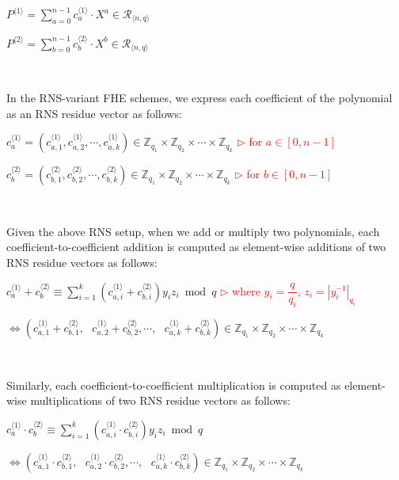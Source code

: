 $P^{\langle 1 \rangle} = \sum\limits_{a=0}^{n-1} c^{\langle 1 \rangle}_a \cdot X^a \in \mathcal{R}_{\langle n, q\rangle}$

$P^{\langle 2 \rangle} = \sum\limits_{b=0}^{n-1} c^{\langle 2 \rangle}_b \cdot X^b \in \mathcal{R}_{\langle n, q\rangle}$

$ $

In the RNS-variant FHE schemes, we express each coefficient of the polynomial as an RNS residue vector as follows:

$c^{\langle 1 \rangle}_a = (c^{\langle 1 \rangle}_{a,1}, c^{\langle 1 \rangle}_{a,2}, \cdots, c^{\langle 1 \rangle}_{a,k}) \in \mathbb{Z}_{q_1} \times \mathbb{Z}_{q_2} \times \cdots \times \mathbb{Z}_{q_k}$ \textcolor{red}{ $\rhd$ for $a \in [0, n - 1]$}

$c^{\langle 2 \rangle}_b = (c^{\langle 2 \rangle}_{b,1}, c^{\langle 2 \rangle}_{b,2}, \cdots, c^{\langle 2 \rangle}_{b,k}) \in \mathbb{Z}_{q_1} \times \mathbb{Z}_{q_2} \times \cdots \times \mathbb{Z}_{q_k}$ \textcolor{red}{ $\rhd$ for $b \in [0, n - 1]$}

$ $

Given the above RNS setup, when we add or multiply two polynomials, each coefficient-to-coefficient addition is computed as element-wise additions of two RNS residue vectors as follows:

$c^{\langle 1 \rangle}_a + c^{\langle 2 \rangle}_b \equiv \sum\limits_{i=1}^k (c^{\langle 1 \rangle}_{a,i} + c^{\langle 2 \rangle}_{b,i}) y_i z_i \bmod q $ \textcolor{red}{ $\rhd$ where $y_i = \dfrac{q}{q_i}$, $z_i = |y_i^{-1}|_{q_i}$}

$\Longleftrightarrow (c^{\langle 1 \rangle}_{a,1} + c^{\langle 2 \rangle}_{b,1}, \text{ } c^{\langle 1 \rangle}_{a,2} + c^{\langle 2 \rangle}_{b,2}, \cdots, \text{ } c^{\langle 1 \rangle}_{a,k} + c^{\langle 2 \rangle}_{b,k}) \in \mathbb{Z}_{q_1} \times \mathbb{Z}_{q_2} \times \cdots \times \mathbb{Z}_{q_k}$

$ $

Similarly, each coefficient-to-coefficient multiplication is computed as element-wise multiplications of two RNS residue vectors as follows:

$c^{\langle 1 \rangle}_a \cdot c^{\langle 2 \rangle}_b \equiv \sum\limits_{i=1}^k (c^{\langle 1 \rangle}_{a,i} \cdot c^{\langle 2 \rangle}_{b,i}) y_i z_i \bmod q $

$\Longleftrightarrow (c^{\langle 1 \rangle}_{a,1} \cdot c^{\langle 2 \rangle}_{b,1}, \text{ } c^{\langle 1 \rangle}_{a,2} \cdot c^{\langle 2 \rangle}_{b,2}, \cdots, \text{ } c^{\langle 1 \rangle}_{a,k} \cdot c^{\langle 2 \rangle}_{b,k}) \in \mathbb{Z}_{q_1} \times \mathbb{Z}_{q_2} \times \cdots \times \mathbb{Z}_{q_k}$

